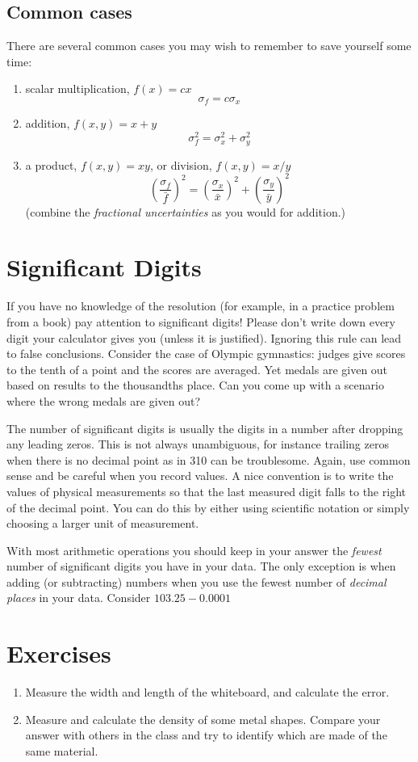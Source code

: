 \subsection{Common cases}
There are several common cases you may wish to remember to save yourself some time:
\begin{enumerate}
\item scalar multiplication, $f(x) = cx$
\[
\sigma_f = c\sigma_x
\]
\item addition, $f(x,y) = x + y$
\[
\sigma_f^2 = \sigma_x^2 + \sigma_y^2
\]
\item a product, $f(x,y) = xy$, or division, $f(x,y) = x/y$
\[
\left( \frac{\sigma_f}{\bar{f}} \right)^2 = \left( \frac{\sigma_x}{\bar{x}} \right)^2 + \left( \frac{\sigma_y}{\bar{y}} \right)^2
\]
(combine the {\em fractional uncertainties} as you would for addition.)
\end{enumerate}


\section{Significant Digits}

If you have no knowledge of the resolution (for example, in a practice problem from a book) pay attention to significant digits!  Please don't write down every digit your calculator gives you (unless it is justified).  Ignoring this rule can lead to false conclusions.  Consider the case of Olympic gymnastics: judges give scores to the tenth of a point and the scores are averaged.  Yet medals are given out based on results to the thousandths place.  Can you come up with a scenario where the wrong medals are given out?

The number of significant digits is usually the digits in a number after dropping any leading zeros.  This is not always unambiguous, for instance trailing zeros when there is no decimal point as in 310 can be troublesome.  Again, use common sense and be careful when you record values.  A nice convention is to write the values of physical measurements so that the last measured digit falls to the right of the decimal point.  You can do this by either using scientific notation or simply choosing a larger unit of measurement.

With most arithmetic operations you should keep in your answer the {\em fewest} number of significant digits you have in your data.  The only exception is when adding (or subtracting) numbers when you use the fewest number of {\em decimal places} in your data.  Consider $103.25 - 0.0001$

\section{Exercises}

\begin{enumerate}
\item Measure the width and length of the whiteboard, and calculate the error.
\item Measure and calculate the density of some metal shapes.  Compare your answer with others in the class and try to identify which are made of the same material.


\end{enumerate}
